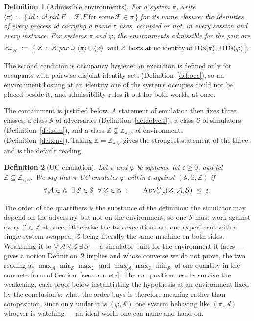 \documentclass[11pt,a4paper]{article}
\newcommand{\PID}{\mathit{pid}}
\newcommand{\pars}{\mathit{par}}
\newcommand{\F}{\mathcal{F}}
\newcommand{\Zenv}{\mathcal{Z}}
\newcommand{\Adv}{\mathcal{A}}
\newcommand{\Sim}{\mathcal{S}}
\newcommand{\advtg}{\op{Adv}}
\newcommand{\Aset}{\mathbb{A}}
\newcommand{\SimSet}{\mathbb{S}}
\newcommand{\ZenvSet}{\mathbb{Z}}
\newcommand{\op}[1]{\textsc{#1}}
\newcommand{\IDs}{\op{IDs}}
\newcommand{\id}{id}
\newcommand{\ncl}[1]{\langle #1 \rangle}
\theoremstyle{accentdef}
\newtheorem{definition}{Definition}[section]
\theoremstyle{accentplain}
\begin{document}
\begin{definition}[Admissible environments]\label{def:admis}
For a system $\pi$, write $\ncl{\pi} := \{\, \id \;:\; \id.\PID.F = \F.F \ \text{for some}\
\F \in \pi \,\}$ for its \emph{name closure}: the identities of every process id carrying a name
$\pi$ uses, occupied or not, in every session and every instance. For systems $\pi$ and
$\varphi$, the environments \emph{admissible} for the pair are
\[
  \ZenvSet_{\pi,\varphi} \;:=\; \bigl\{\, \Zenv \;:\; \Zenv.\pars \supseteq \ncl{\pi} \cup \ncl{\varphi}
  \ \text{ and } \Zenv \text{ hosts at no identity of } \IDs(\pi) \cup \IDs(\varphi) \,\bigr\} .
\]
\end{definition}

The second condition is occupancy hygiene: an execution is defined only for occupants with
pairwise disjoint identity sets (Definition~\ref{def:occ}), so an environment hosting at an identity one
of the systems occupies could not be placed beside it, and admissibility rules it out for both
worlds at once.

The containment is justified below. A statement of emulation then fixes three classes: a class
$\Aset$ of adversaries (Definition~\ref{def:advcls}), a class $\SimSet$ of simulators
(Definition~\ref{def:sim}), and a class
$\ZenvSet \subseteq \ZenvSet_{\pi,\varphi}$ of environments (Definition~\ref{def:env}). Taking
$\ZenvSet = \ZenvSet_{\pi,\varphi}$ gives the strongest statement of the three, and is the
default reading.

\begin{definition}[UC emulation]\label{def:uc}
Let $\pi$ and $\varphi$ be systems, let $\varepsilon \geq 0$, and let $\ZenvSet \subseteq \ZenvSet_{\pi,\varphi}$.
We say that $\pi$ \emph{UC-emulates} $\varphi$ \emph{within $\varepsilon$ against}
$(\Aset,\SimSet,\ZenvSet)$ if
\[
  \forall\, \Adv \in \Aset \ \ \exists\, \Sim \in \SimSet \ \ \forall\, \Zenv \in \ZenvSet \ : \qquad
  \advtg^{\op{uc}}_{\pi,\varphi}(\Zenv,\Adv,\Sim) \;\leq\; \varepsilon .
\]
\end{definition}

The order of the quantifiers is the substance of the definition: the simulator may depend on the
adversary but not on the environment, so one $\Sim$ must work against every $\Zenv \in \ZenvSet$
at once. Otherwise the two executions are one experiment with a single system swapped, $\Zenv$
being literally the same machine on both sides. Weakening it to
$\forall\, \Adv\ \forall\, \Zenv\ \exists\, \Sim$ --- a simulator built for the environment it
faces --- gives a notion Definition~\ref{def:uc} implies and whose converse we do not prove, the
two reading as $\max_\Adv \min_\Sim \max_\Zenv$ and $\max_\Adv \max_\Zenv \min_\Sim$ of one
quantity in the concrete form of Section~\ref{sec:concrete}. The composition results survive the
weakening, each proof below instantiating the hypothesis at an environment fixed by the
conclusion's; what the order buys is therefore meaning rather than composition, since only under it
is $(\varphi,\Sim)$ one system behaving like $(\pi,\Adv)$ whoever is watching --- an ideal world
one can name and hand on.
\end{document}
